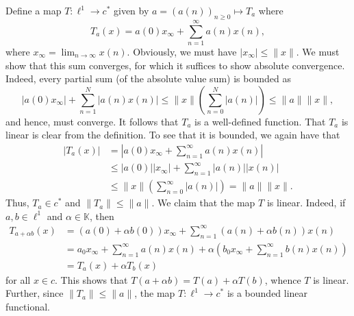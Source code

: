 \documentclass[10pt]{amsart}
\theoremstyle{thmstyle}
\theoremstyle{defstyle}
\newcommand{\K}{\mathbb{K}}
\renewcommand{\le}{\leqslant}
\renewcommand{\ge}{\geqslant}
\begin{document}
Define a map $T: \ell^1\to c^\ast$ given by $a = (a(n))_{n\ge 0}\longmapsto T_a$ where 
\begin{equation*}
	T_a(x) = a(0)x_\infty + \sum_{n = 1}^\infty a(n)x(n),
\end{equation*}
where $x_\infty = \lim_{n\to\infty} x(n)$. Obviously, we must have $|x_\infty|\le \|x\|$. We must show that this sum converges, for which it suffices to show absolute convergence. Indeed, every partial sum (of the absolute value sum) is bounded as 
\begin{equation*}
	|a(0)x_\infty| + \sum_{n = 1}^N |a(n)x(n)|\le \|x\|\left(\sum_{n = 0}^N |a(n)|\right)\le \|a\|\|x\|,
\end{equation*}
and hence, must converge. It follows that $T_a$ is a well-defined function. That $T_a$ is linear is clear from the definition. To see that it is bounded, we again have that 
\begin{align*}
	|T_a(x)| &= \left|a(0)x_\infty + \sum_{n = 1}^\infty a(n)x(n)\right|\\
	&\le |a(0)||x_\infty| + \sum_{n = 1}^\infty |a(n)||x(n)|\\
	&\le \|x\|\left(\sum_{n = 0}^\infty |a(n)|\right) = \|a\|\|x\|.
\end{align*}
Thus, $T_a\in c^\ast$ and $\|T_a\|\le \|a\|$. We claim that the map $T$ is linear. Indeed, if $a, b\in\ell^1$ and $\alpha\in\K$, then 
\begin{align*}
	T_{a + \alpha b}(x) &= \left(a(0) + \alpha b(0)\right)x_\infty + \sum_{n = 1}^\infty\left(a(n) + \alpha b(n)\right)x(n)\\
	&= a_0 x_\infty + \sum_{n = 1}^\infty a(n)x(n) + \alpha\left(b_0x_\infty + \sum_{n = 1}^\infty b(n)x(n)\right)\\
	&= T_a(x) + \alpha T_b(x)
\end{align*}
for all $x\in c$. This shows that $T(a + \alpha b) = T(a) + \alpha T(b)$, whence $T$ is linear. Further, since $\|T_a\|\le\|a\|$, the map $T: \ell^1\to c^\ast$ is a bounded linear functional.
\end{document}
